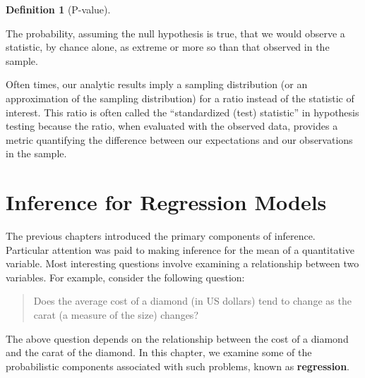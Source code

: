 \documentclass[
  letterpaper,
  DIV=11,
  numbers=noendperiod]{scrreprt}
\theoremstyle{plain}
\theoremstyle{definition}
\newtheorem{definition}{Definition}[chapter]
\theoremstyle{definition}
\theoremstyle{remark}
\begin{document}
\begin{definition}[P-value]\protect\hypertarget{def-pvalue}{}\label{def-pvalue}

The probability, assuming the null hypothesis is true, that we would
observe a statistic, by chance alone, as extreme or more so than that
observed in the sample.

\end{definition}

\begin{tcolorbox}[enhanced jigsaw, toprule=.15mm, left=2mm, title=\textcolor{quarto-callout-note-color}{\faInfo}\hspace{0.5em}{Note}, opacityback=0, toptitle=1mm, leftrule=.75mm, colbacktitle=quarto-callout-note-color!10!white, opacitybacktitle=0.6, titlerule=0mm, breakable, colframe=quarto-callout-note-color-frame, arc=.35mm, coltitle=black, bottomtitle=1mm, rightrule=.15mm, colback=white, bottomrule=.15mm]

Often times, our analytic results imply a sampling distribution (or an
approximation of the sampling distribution) for a ratio instead of the
statistic of interest. This ratio is often called the ``standardized
(test) statistic'' in hypothesis testing because the ratio, when
evaluated with the observed data, provides a metric quantifying the
difference between our expectations and our observations in the sample.

\end{tcolorbox}


\hypertarget{sec-regression}{%
\chapter{Inference for Regression Models}\label{sec-regression}}

The previous chapters introduced the primary components of inference.
Particular attention was paid to making inference for the mean of a
quantitative variable. Most interesting questions involve examining a
relationship between two variables. For example, consider the following
question:

\begin{quote}
Does the average cost of a diamond (in US dollars) tend to change as the
carat (a measure of the size) changes?
\end{quote}

The above question depends on the relationship between the cost of a
diamond and the carat of the diamond. In this chapter, we examine some
of the probabilistic components associated with such problems, known as
\textbf{regression}.
\end{document}
